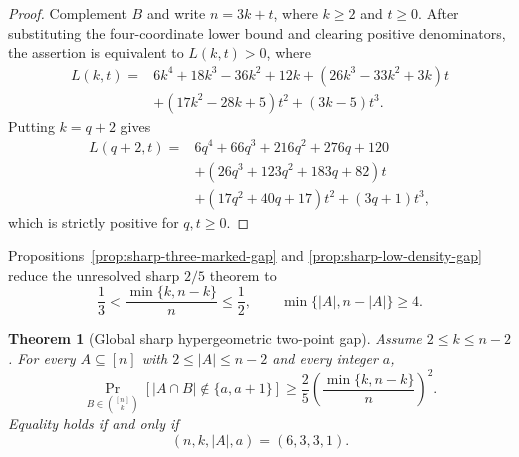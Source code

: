 \documentclass[11pt]{article}
\newtheorem{theorem}{Theorem}[section]
\theoremstyle{definition}
\theoremstyle{remark}
\newcommand{\1}{\mathbf 1}
\begin{document}
\begin{proof}
Complement \(B\) and write \(n=3k+t\), where \(k\ge2\) and \(t\ge0\).
After substituting the four-coordinate lower bound and clearing positive
denominators, the assertion is equivalent to \(L(k,t)>0\), where
\[
\begin{aligned}
L(k,t)={}&6k^4+18k^3-36k^2+12k
 +(26k^3-33k^2+3k)t\\
&+(17k^2-28k+5)t^2+(3k-5)t^3.
\end{aligned}
\]
Putting \(k=q+2\) gives
\[
\begin{aligned}
L(q+2,t)={}&6q^4+66q^3+216q^2+276q+120\\
&+(26q^3+123q^2+183q+82)t\\
&+(17q^2+40q+17)t^2+(3q+1)t^3,
\end{aligned}
\]
which is strictly positive for \(q,t\ge0\).
\end{proof}

Propositions~\ref{prop:sharp-three-marked-gap} and
\ref{prop:sharp-low-density-gap} reduce the unresolved sharp \(2/5\) theorem
to
\[
 \frac13<\frac{\min\{k,n-k\}}n\le\frac12,
 \qquad
 \min\{|A|,n-|A|\}\ge4.
\]



\begin{theorem}[Global sharp hypergeometric two-point gap]
\label{thm:global-sharp-hypergeometric-gap}
Assume \(2\le k\le n-2\).  For every \(A\subseteq[n]\) with
\(2\le|A|\le n-2\) and every integer \(a\),
\[
 \Pr_{B\in\binom{[n]}k}[|A\cap B|\notin\{a,a+1\}]
 \ge\frac25
 \left(\frac{\min\{k,n-k\}}n\right)^2.
\]
Equality holds if and only if
\[
 (n,k,|A|,a)=(6,3,3,1).
\]
\end{theorem}
\end{document}
